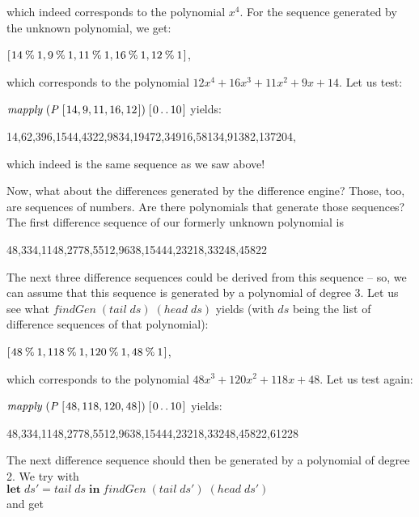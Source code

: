 \documentclass[tikz]{scrreprt}
\newcommand{\Conid}[1]{\mathit{#1}}
\newcommand{\Varid}[1]{\mathit{#1}}
\begin{document}
which indeed corresponds to the polynomial $x^4$. 
For the sequence generated by the unknown polynomial,
we get:

\ensuremath{[\mskip1.5mu \mathrm{14}\mathbin{\%}\mathrm{1},\mathrm{9}\mathbin{\%}\mathrm{1},\mathrm{11}\mathbin{\%}\mathrm{1},\mathrm{16}\mathbin{\%}\mathrm{1},\mathrm{12}\mathbin{\%}\mathrm{1}\mskip1.5mu]},

which corresponds to the polynomial
$12x^4 + 16x^3 + 11x^2 + 9x + 14$.
Let us test:

\ensuremath{\Varid{mapply}\;(\Conid{P}\;[\mskip1.5mu \mathrm{14},\mathrm{9},\mathrm{11},\mathrm{16},\mathrm{12}\mskip1.5mu])\;[\mskip1.5mu \mathrm{0}\mathinner{\ldotp\ldotp}\mathrm{10}\mskip1.5mu]} yields:

14,62,396,1544,4322,9834,19472,34916,58134,91382,137204,

which indeed is the same sequence as we saw above!

Now, what about the differences generated
by the difference engine? Those, too, are sequences
of numbers. Are there polynomials
that generate those sequences?
The first difference sequence of our formerly unknown polynomial is

48,334,1148,2778,5512,9638,15444,23218,33248,45822

The next three difference sequences could be derived
from this sequence -- so, we can assume that this sequence
is generated by a polynomial of degree 3. Let us see
what \ensuremath{\Varid{findGen}\;(\Varid{tail}\;\Varid{ds})\;(\Varid{head}\;\Varid{ds})} yields (with \ensuremath{\Varid{ds}}
being the list of difference sequences of that polynomial):

\ensuremath{[\mskip1.5mu \mathrm{48}\mathbin{\%}\mathrm{1},\mathrm{118}\mathbin{\%}\mathrm{1},\mathrm{120}\mathbin{\%}\mathrm{1},\mathrm{48}\mathbin{\%}\mathrm{1}\mskip1.5mu]}, 

which corresponds to the polynomial 
$48x^3 + 120x^2 + 118x + 48$.
Let us test again:

\ensuremath{\Varid{mapply}\;(\Conid{P}\;[\mskip1.5mu \mathrm{48},\mathrm{118},\mathrm{120},\mathrm{48}\mskip1.5mu])\;[\mskip1.5mu \mathrm{0}\mathinner{\ldotp\ldotp}\mathrm{10}\mskip1.5mu]} yields:

48,334,1148,2778,5512,9638,15444,23218,33248,45822,61228

The next difference sequence should then be generated
by a polynomial of degree 2. We try with\\
\ensuremath{\mathbf{let}\;\Varid{ds'}\mathrel{=}\Varid{tail}\;\Varid{ds}\;\mathbf{in}\;\Varid{findGen}\;(\Varid{tail}\;\Varid{ds'})\;(\Varid{head}\;\Varid{ds'})}\\
 and get
\end{document}
